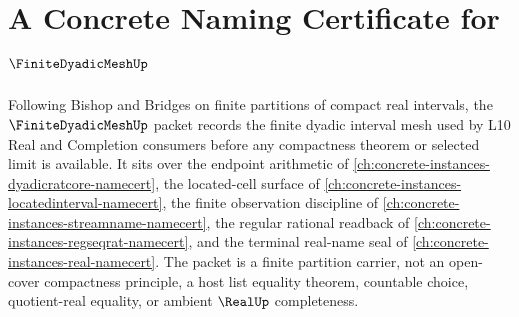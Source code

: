 \chapter{A Concrete Naming Certificate for $\FiniteDyadicMeshUp$}
\label{ch:concrete-instances-finite-dyadic-mesh-namecert}

Following Bishop and Bridges on finite partitions of compact real intervals, the $\FiniteDyadicMeshUp$ packet records the finite dyadic interval mesh used by L10 Real and Completion consumers before any compactness theorem or selected limit is available. It sits over the endpoint arithmetic of \autoref{ch:concrete-instances-dyadicratcore-namecert}, the located-cell surface of \autoref{ch:concrete-instances-locatedinterval-namecert}, the finite observation discipline of \autoref{ch:concrete-instances-streamname-namecert}, the regular rational readback of \autoref{ch:concrete-instances-regseqrat-namecert}, and the terminal real-name seal of \autoref{ch:concrete-instances-real-namecert}. The packet is a finite partition carrier, not an open-cover compactness principle, a host list equality theorem, countable choice, quotient-real equality, or ambient $\RealUp$ completeness.

